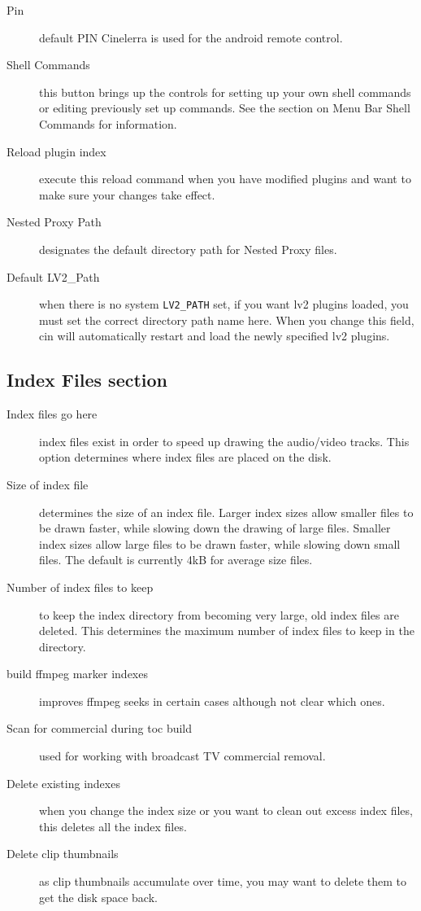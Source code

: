 \begin{description}
    \item[Pin] default PIN Cinelerra is used for the android remote control.
    \item[Shell Commands] this button brings up the controls for setting up your own shell commands or editing previously set up commands.  See the section on Menu Bar Shell Commands for information.
    \item[Reload plugin index] execute this reload command when you have modified plugins and want to make sure your changes take effect.
    \item[Nested Proxy Path] designates the default directory path for Nested Proxy files.
    \item[Default LV2\_Path] when there is no system \texttt{LV2\_PATH} set, if you want lv2 plugins loaded, you must set the correct directory path name here. When you change this field, cin will automatically restart and load the newly specified lv2 plugins.
\end{description}

\subsection{Index Files section}%
\label{sub:index_file_section}

\begin{description}
    \item[Index files go here] index files exist in order to speed up drawing the audio/video tracks. This option determines where index files are placed on the disk.
    \item[Size of index file] determines the size of an index file. Larger index sizes allow smaller files to be drawn faster, while slowing down the drawing of large files. Smaller index sizes allow large files to be drawn faster, while slowing down small files.  The default is currently 4kB for average size files.
    \item[Number of index files to keep] to keep the index directory from becoming very large, old index files are deleted. This determines the maximum number of index files to keep in the directory.
    \item[build ffmpeg marker indexes] improves ffmpeg seeks in certain cases although not clear which ones.
    \item[Scan for commercial during toc build] used for working with broadcast TV commercial removal.
    \item[Delete existing indexes] when you change the index size or you want to clean out excess index files, this deletes all the index files.
    \item[Delete clip thumbnails] as clip thumbnails accumulate over time, you may want to delete them to get the disk space back.
\end{description}

